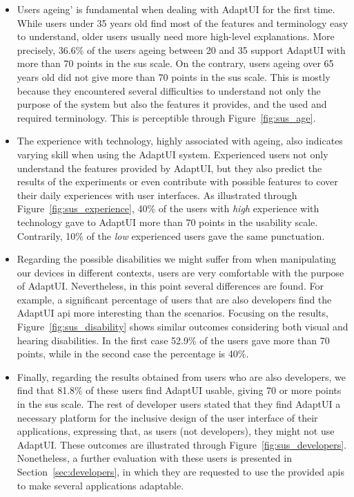 \begin{itemize}
  \item Users ageing' is fundamental when dealing with AdaptUI for the first 
  time. While users under 35 years old find most of the features and terminology 
  easy to understand, older users usually need more high-level explanations. 
  More precisely, 36.6\% of the users ageing between 20 and 35 support AdaptUI 
  with more than 70 points in the \ac{sus} scale. On the contrary, users ageing 
  over 65 years old did not give more than 70 points in the \ac{sus} scale. This 
  is mostly because they encountered several difficulties to understand not only 
  the purpose of the system but also the features it provides, and the used and 
  required terminology. This is perceptible through Figure~\ref{fig:sus_age}.
  
  \item The experience with technology, highly associated with ageing, also 
  indicates varying skill when using the AdaptUI system. Experienced users
  not only understand the features provided by AdaptUI, but they also predict
  the results of the experiments or even contribute with possible features to 
  cover their daily experiences with user interfaces. As illustrated through
  Figure~\ref{fig:sus_experience}, 40\% of the users with \textit{high} 
  experience with technology gave to AdaptUI more than 70 points in the 
  usability scale. Contrarily, 10\% of the \textit{low} experienced users gave
  the same punctuation.
  
  \item Regarding the possible disabilities we might suffer from when 
  manipulating our devices in different contexts, users are very comfortable 
  with the purpose of AdaptUI. Nevertheless, in this point several differences
  are found. For example, a significant percentage of users that are
  also developers find the AdaptUI \ac{api} more interesting than the scenarios. 
  Focusing on the results, Figure~\ref{fig:sus_disability} shows similar outcomes 
  considering both visual and hearing disabilities. In the first case 52.9\% of 
  the  users gave more than 70 points, while in the second case the percentage 
  is 40\%.
  
  \item Finally, regarding the results obtained from users who are also 
  developers, we find that 81.8\% of these users find AdaptUI usable, 
  giving 70 or more points in the \ac{sus} scale. The rest of developer users 
  stated that they find AdaptUI a necessary platform for the inclusive design of 
  the user interface of their applications, expressing that, as users (not 
  developers), they might not use AdaptUI. These outcomes are illustrated
  through Figure~\ref{fig:sus_developers}. Nonetheless, a further evaluation
  with these users is presented in Section~\ref{sec:developers}, in which they
  are requested to use the provided \acp{api} to make several applications
  adaptable.
\end{itemize}

